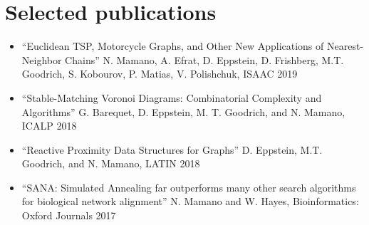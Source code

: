 \documentclass[letterpaper,10pt,oneside]{article}
\begin{document}
\section*{Selected publications}
\begin{itemize}[leftmargin=15px]
\item ``Euclidean TSP, Motorcycle Graphs, and Other New Applications of Nearest-Neighbor Chains'' N. Mamano, A. Efrat, D. Eppstein, D. Frishberg, M.T. Goodrich, S. Kobourov, P. Matias, V. Polishchuk, ISAAC 2019
\item ``Stable-Matching Voronoi Diagrams: Combinatorial Complexity and Algorithms'' G. Barequet, D. Eppstein, M. T. Goodrich, and N. Mamano, ICALP 2018
\item ``Reactive Proximity Data Structures for Graphs'' D. Eppstein, M.T. Goodrich, and N. Mamano, LATIN 2018
\item ``SANA: Simulated Annealing far outperforms many other search algorithms for biological network alignment'' N. Mamano and W. Hayes, Bioinformatics: Oxford Journals 2017
\end{itemize}
\end{document}
